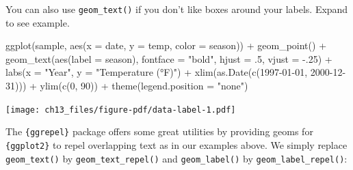 \documentclass[
  letterpaper,
]{scrbook}
\newenvironment{Shaded}{\begin{snugshade}}{\end{snugshade}}
\newcommand{\AttributeTok}[1]{\textcolor[rgb]{0.40,0.45,0.13}{#1}}
\newcommand{\DecValTok}[1]{\textcolor[rgb]{0.68,0.00,0.00}{#1}}
\newcommand{\FunctionTok}[1]{\textcolor[rgb]{0.28,0.35,0.67}{#1}}
\newcommand{\NormalTok}[1]{\textcolor[rgb]{0.00,0.23,0.31}{#1}}
\newcommand{\SpecialCharTok}[1]{\textcolor[rgb]{0.37,0.37,0.37}{#1}}
\newcommand{\StringTok}[1]{\textcolor[rgb]{0.13,0.47,0.30}{#1}}
\begin{document}
\begin{tcolorbox}[enhanced jigsaw, toprule=.15mm, bottomtitle=1mm, coltitle=black, breakable, colbacktitle=quarto-callout-tip-color!10!white, opacityback=0, toptitle=1mm, colframe=quarto-callout-tip-color-frame, titlerule=0mm, title=\textcolor{quarto-callout-tip-color}{\faLightbulb}\hspace{0.5em}{Using \texttt{geom\_text()}}, bottomrule=.15mm, arc=.35mm, opacitybacktitle=0.6, leftrule=.75mm, left=2mm, rightrule=.15mm, colback=white]

You can also use \texttt{geom\_text()} if you don't like boxes around
your labels. Expand to see example.

\begin{Shaded}
\begin{Highlighting}[]
\FunctionTok{ggplot}\NormalTok{(sample, }\FunctionTok{aes}\NormalTok{(}\AttributeTok{x =}\NormalTok{ date, }\AttributeTok{y =}\NormalTok{ temp, }\AttributeTok{color =}\NormalTok{ season)) }\SpecialCharTok{+}
  \FunctionTok{geom\_point}\NormalTok{() }\SpecialCharTok{+}
  \FunctionTok{geom\_text}\NormalTok{(}\FunctionTok{aes}\NormalTok{(}\AttributeTok{label =}\NormalTok{ season), }\AttributeTok{fontface =} \StringTok{"bold"}\NormalTok{,}
            \AttributeTok{hjust =}\NormalTok{ .}\DecValTok{5}\NormalTok{, }\AttributeTok{vjust =} \SpecialCharTok{{-}}\NormalTok{.}\DecValTok{25}\NormalTok{) }\SpecialCharTok{+}
  \FunctionTok{labs}\NormalTok{(}\AttributeTok{x =} \StringTok{"Year"}\NormalTok{, }\AttributeTok{y =} \StringTok{"Temperature (°F)"}\NormalTok{) }\SpecialCharTok{+}
  \FunctionTok{xlim}\NormalTok{(}\FunctionTok{as.Date}\NormalTok{(}\FunctionTok{c}\NormalTok{(}\StringTok{\textquotesingle{}1997{-}01{-}01\textquotesingle{}}\NormalTok{, }\StringTok{\textquotesingle{}2000{-}12{-}31\textquotesingle{}}\NormalTok{))) }\SpecialCharTok{+}
  \FunctionTok{ylim}\NormalTok{(}\FunctionTok{c}\NormalTok{(}\DecValTok{0}\NormalTok{, }\DecValTok{90}\NormalTok{)) }\SpecialCharTok{+}
  \FunctionTok{theme}\NormalTok{(}\AttributeTok{legend.position =} \StringTok{"none"}\NormalTok{)}
\end{Highlighting}
\end{Shaded}

\texttt{[image: ch13\_files/figure-pdf/data-label-1.pdf]}

\end{tcolorbox}

The \texttt{\{ggrepel\}} package offers some great utilities by
providing geoms for \texttt{\{ggplot2\}} to repel overlapping text as in
our examples above. We simply replace \texttt{geom\_text()} by
\texttt{geom\_text\_repel()} and \texttt{geom\_label()} by
\texttt{geom\_label\_repel()}:
\end{document}
